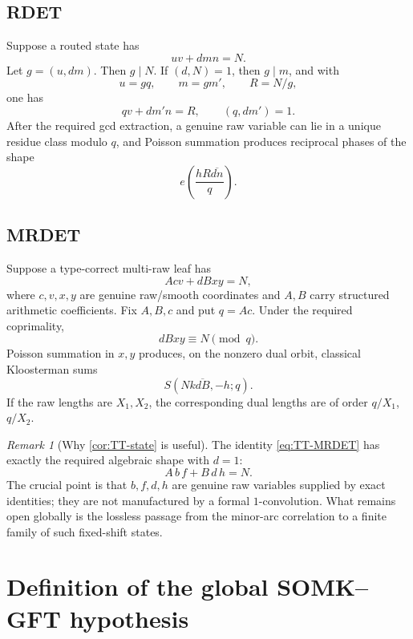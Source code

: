 \documentclass[11pt]{article}
\theoremstyle{definition}
\theoremstyle{remark}
\newtheorem{remark}[theorem]{Remark}
\newcommand{\1}{\mathbf 1}
\begin{document}
\subsection{RDET}

Suppose a routed state has
\begin{equation}\label{eq:RDET}
 uv+dmn=N.
\end{equation}
Let \(g=(u,dm)\).  Then \(g\mid N\).  If \((d,N)=1\), then \(g\mid m\), and with
\[
 u=gq,\qquad m=gm',\qquad R=N/g,
\]
one has
\[
 qv+dm'n=R,
 \qquad
 (q,dm')=1.
\]
After the required gcd extraction, a genuine raw variable can lie in a unique residue class modulo \(q\), and Poisson summation produces reciprocal phases of the shape
\[
 e\!\left(\frac{hR\overline{dn}}q\right).
\]

\subsection{MRDET}

Suppose a type-correct multi-raw leaf has
\begin{equation}\label{eq:MRDET}
 Acv+dBxy=N,
\end{equation}
where \(c,v,x,y\) are genuine raw/smooth coordinates and \(A,B\) carry structured arithmetic coefficients.  Fix \(A,B,c\) and put \(q=Ac\).  Under the required coprimality,
\[
 dBxy\equiv N\pmod q.
\]
Poisson summation in \(x,y\) produces, on the nonzero dual orbit, classical Kloosterman sums
\begin{equation}\label{eq:mrdet-kl}
 S\!\left(Nk\overline{dB},-h;q\right).
\end{equation}
If the raw lengths are \(X_1,X_2\), the corresponding dual lengths are of order \(q/X_1\), \(q/X_2\).

\begin{remark}[Why \cref{cor:TT-state} is useful]
The identity \eqref{eq:TT-MRDET} has exactly the required algebraic shape with \(d=1\):
\[
 A\,b\,f+B\,d\,h=N.
\]
The crucial point is that \(b,f,d,h\) are genuine raw variables supplied by exact identities; they are not manufactured by a formal \(1\)-convolution.  What remains open globally is the lossless passage from the minor-arc correlation to a finite family of such fixed-shift states.
\end{remark}

\section{Definition of the global SOMK--GFT hypothesis}\label{sec:somk-def}
\end{document}
